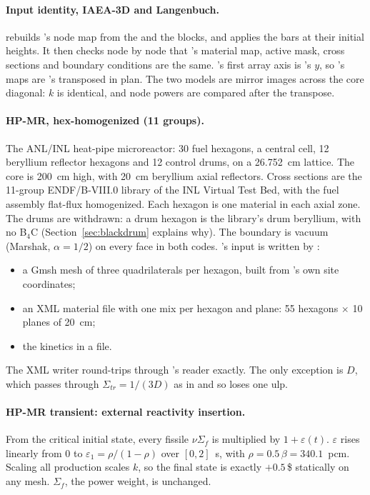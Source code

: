 \paragraph{Input identity, IAEA-3D and Langenbuch.}
 rebuilds \ffn's node
map from the   and the 
 blocks, and applies the bars at their initial heights. It then
checks node by node that \garnet's material map, active mask, cross sections
and boundary conditions are the same. \garnet's first array axis is \ffn's
$y$, so \garnet's maps are \ffn's transposed in plan. The two models are
mirror images across the core diagonal: $k$ is identical, and node powers are
compared after the transpose.

\paragraph{HP-MR, hex-homogenized (11 groups).} The ANL/INL heat-pipe
microreactor: 30 fuel hexagons, a central cell, 12 beryllium reflector
hexagons and 12 control drums, on a 26.752~cm lattice. The core is 200~cm
high, with 20~cm beryllium axial reflectors. Cross sections are the 11-group
ENDF/B-VIII.0 library of the INL Virtual Test Bed, with the fuel assembly
flat-flux homogenized. Each hexagon is one material in each axial zone. The
drums are withdrawn: a drum hexagon is the library's drum beryllium, with no
B$_4$C (Section~\ref{sec:blackdrum} explains why). The boundary is
vacuum (Marshak, $\alpha = 1/2$) on every face in both codes. \ffn's input is
written by :
\begin{itemize}
\item a Gmsh mesh of three quadrilaterals per hexagon, built from \garnet's
  own site coordinates;
\item an XML material file with one mix per hexagon and plane: 55 hexagons
  $\times$ 10 planes of 20~cm;
\item the kinetics in a  file.
\end{itemize}
The XML writer round-trips through \garnet's reader exactly. The only
exception is $D$, which passes through $\Sigma_{tr} = 1/(3D)$ as in \ffn{}
and so loses one ulp.

\paragraph{HP-MR transient: external reactivity insertion.} From the critical
initial state, every fissile $\nu\Sigma_f$ is multiplied by
$1 + \varepsilon(t)$. $\varepsilon$ rises linearly from 0 to
$\varepsilon_1 = \rho/(1-\rho)$ over $[0, 2]$~s, with
$\rho = 0.5\,\beta = 340.1$~pcm. Scaling all production scales $k$, so the
final state is exactly $+0.5$\,\$ statically on any mesh. $\Sigma_f$, the
power weight, is unchanged.

